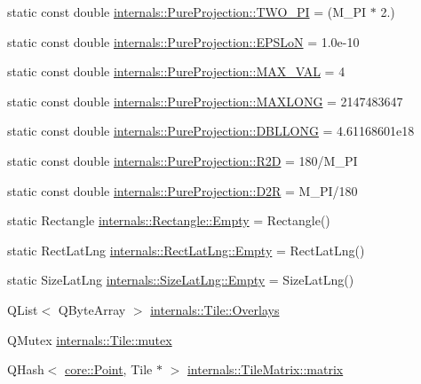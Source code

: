 \begin{DoxyCompactItemize}
\item 
static const double \hyperlink{group___o_p_map_widget_gac2ca007c6c6f6c095902daca2254d4bb}{internals\-::\-Pure\-Projection\-::\-T\-W\-O\-\_\-\-P\-I} = (\-M\-\_\-\-P\-I $\ast$ 2.)
\item 
static const double \hyperlink{group___o_p_map_widget_ga48583ac82eb87f081f2dc32a9ab39349}{internals\-::\-Pure\-Projection\-::\-E\-P\-S\-Lo\-N} = 1.\-0e-\/10
\item 
static const double \hyperlink{group___o_p_map_widget_ga34e30a80435ba07c4e95b56f24935ceb}{internals\-::\-Pure\-Projection\-::\-M\-A\-X\-\_\-\-V\-A\-L} = 4
\item 
static const double \hyperlink{group___o_p_map_widget_gad58d07a94d560015458a3411190b5cc0}{internals\-::\-Pure\-Projection\-::\-M\-A\-X\-L\-O\-N\-G} = 2147483647
\item 
static const double \hyperlink{group___o_p_map_widget_gaffa95138ab57a5c0267eb66399bbdc5c}{internals\-::\-Pure\-Projection\-::\-D\-B\-L\-L\-O\-N\-G} = 4.\-61168601e18
\item 
static const double \hyperlink{group___o_p_map_widget_ga112e42b7b86260ce042d7c14b4ece2b7}{internals\-::\-Pure\-Projection\-::\-R2\-D} = 180/\-M\-\_\-\-P\-I
\item 
static const double \hyperlink{group___o_p_map_widget_ga52ec5ac7446a549728bf6e9c798ed6f6}{internals\-::\-Pure\-Projection\-::\-D2\-R} = \-M\-\_\-\-P\-I/180
\item 
static \-Rectangle \hyperlink{group___o_p_map_widget_ga747b738c524d1f0bb7b4a00e9de42da4}{internals\-::\-Rectangle\-::\-Empty} = \-Rectangle()
\item 
static \-Rect\-Lat\-Lng \hyperlink{group___o_p_map_widget_ga0975dcf29ee445b5510f2c502940b50a}{internals\-::\-Rect\-Lat\-Lng\-::\-Empty} = \-Rect\-Lat\-Lng()
\item 
static \-Size\-Lat\-Lng \hyperlink{group___o_p_map_widget_gad305f7cf650e7a5490bb77ccc65bbe08}{internals\-::\-Size\-Lat\-Lng\-::\-Empty} = \-Size\-Lat\-Lng()
\item 
\-Q\-List$<$ \-Q\-Byte\-Array $>$ \hyperlink{group___o_p_map_widget_ga45369aa8480e3bd7ff5c6a6017573361}{internals\-::\-Tile\-::\-Overlays}
\item 
\-Q\-Mutex \hyperlink{group___o_p_map_widget_gadfb1115a74bee691ed9d70c97b727ef7}{internals\-::\-Tile\-::mutex}
\item 
\-Q\-Hash$<$ \hyperlink{structcore_1_1_point}{core\-::\-Point}, \-Tile $\ast$ $>$ \hyperlink{group___o_p_map_widget_gaecc6fdfe28242560867ab83c02820b20}{internals\-::\-Tile\-Matrix\-::matrix}

\end{DoxyCompactItemize}

